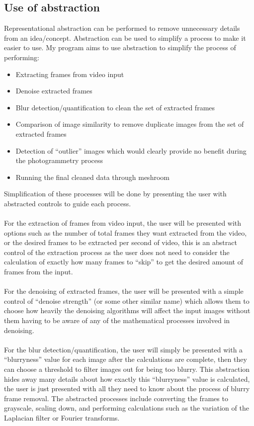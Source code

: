 \documentclass[11pt]{report}
\begin{document}
\subsection{Use of abstraction}
Representational abstraction can be performed to remove unnecessary details from an idea/concept. Abstraction can be used to simplify a process to make it easier to use.
My program aims to use abstraction to simplify the process of performing:
\begin{itemize}
\item Extracting frames from video input
\item Denoise extracted frames
\item Blur detection/quantification to clean the set of extracted frames
\item Comparison of image similarity to remove duplicate images from the set of extracted frames
\item Detection of ``outlier'' images which would clearly provide no benefit during the photogrammetry process
\item Running the final cleaned data through meshroom
\end{itemize}
Simplification of these processes will be done by presenting the user with abstracted controls to guide each process.\\\\
For the extraction of frames from video input, the user will be presented with options such as the number of total frames they want extracted from the video, or the desired frames to be extracted per second of video, this is an abstract control of the extraction process as the user does not need to consider the calculation of exactly how many frames to ``skip'' to get the desired amount of frames from the input.\\\\
For the denoising of extracted frames, the user will be presented with a simple control of ``denoise strength'' (or some other similar name) which allows them to choose how heavily the denoising algorithms will affect the input images without them having to be aware of any of the mathematical processes involved in denoising.\\\\
For the blur detection/quantification, the user will simply be presented with a ``blurryness'' value for each image after the calculations are complete, then they can choose a threshold to filter images out for being too blurry. This abstraction hides away many details about how exactly this ``blurryness'' value is calculated, the user is just presented with all they need to know about the process of blurry frame removal. The abstracted processes include converting the frames to grayscale, scaling down, and performing calculations such as the variation of the Laplacian filter or Fourier transforms.\\\\
\end{document}
